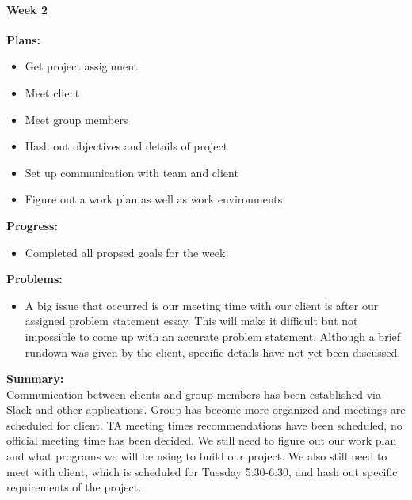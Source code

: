 \paragraph{Week 2}
\begin{adjustwidth}{2.5em}{0pt}
    \vspace{-0.5cm}\textbf{Plans:}
    \vspace{-0.5cm}
    \begin{itemize}
        \item Get project assignment
        \item Meet client
		\item Meet group members
		\item Hash out objectives and details of project
		\item Set up communication with team and client
		\item Figure out a work plan as well as work environments
		
    \end{itemize} 
    \vspace{-0.3cm}\textbf{Progress:}
    \vspace{-0.5cm}
    \begin{itemize}
        \item Completed all propsed goals for the week
    \end{itemize} 
    \vspace{-0.3cm}\textbf{Problems:}
    \vspace{-0.5cm}
    \begin{itemize}
        \item A big issue that occurred is our meeting time with our client is after our assigned problem statement essay. This will make it difficult but not impossible to come up with an accurate problem statement. Although a brief rundown was given by the client, specific details have not yet been discussed.
    \end{itemize}  
    \vspace{-0.3cm}\noindent\textbf{Summary:}\\
    \noindent Communication between clients and group members has been established via Slack and other applications. Group has become more organized and meetings are scheduled for client. TA meeting times recommendations  have been scheduled, no official meeting time has been decided. We still need to figure out our work plan and what programs we will be using to build our project. We also still need to meet with client, which is scheduled for Tuesday 5:30-6:30, and hash out specific requirements of the project.
	\end{adjustwidth} 
